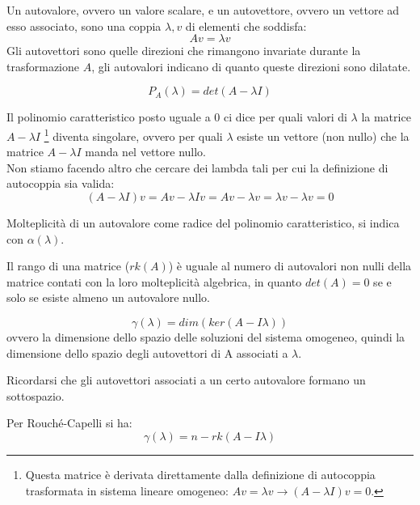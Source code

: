 \documentclass[12pt,a4paper,]{report}
\begin{document}
\begin{definizione}
    Un autovalore, ovvero un valore scalare, e un autovettore, ovvero un vettore ad esso associato, sono una coppia $\lambda, v$ di elementi che soddisfa:
    $$Av = \lambda v$$
    Gli autovettori sono quelle direzioni che rimangono invariate durante la trasformazione $A$, gli autovalori indicano di quanto queste direzioni sono dilatate.
\end{definizione}
\begin{definizione}
    \[P_A(\lambda) = det(A - \lambda I)\]
\end{definizione}
\begin{nota}
    Il polinomio caratteristico posto uguale a 0 ci dice per quali valori di $\lambda$ la matrice $A - \lambda I$
    \footnote{Questa matrice è derivata direttamente dalla definizione di autocoppia trasformata in sistema lineare omogeneo: $Av = \lambda v \to (A- \lambda I)v=0$.}
    diventa singolare, ovvero per quali $\lambda$ esiste un vettore (non nullo) che la matrice $A - \lambda I$ manda nel vettore nullo.\\
    Non stiamo facendo altro che cercare dei lambda tali per cui la definizione di autocoppia sia valida:
    \[
    (A-\lambda I)v = Av - \lambda I v = Av - \lambda v = \lambda v - \lambda v = 0
    \]
\end{nota}
\begin{definizione}
    Molteplicità di un autovalore come radice del polinomio caratteristico, si indica con $\alpha(\lambda)$.
\end{definizione}

\begin{nota}
    Il rango di una matrice ($rk(A)$) è uguale al numero di autovalori non nulli della matrice contati con la loro molteplicità algebrica, in quanto $det(A) = 0$ se e solo se esiste almeno un autovalore nullo.
\end{nota}
\begin{definizione}
    \[
    \gamma (\lambda) = dim(ker(A-I\lambda))
    \]
    ovvero la dimensione dello spazio delle soluzioni del sistema omogeneo, quindi la dimensione dello spazio degli autovettori di A associati a $\lambda$.
    \begin{nota}
        Ricordarsi che gli autovettori associati a un certo autovalore formano un sottospazio.
    \end{nota}
    \noindent
    Per Rouché-Capelli si ha:
    \[
    \gamma(\lambda) = n - rk(A-I\lambda)
    \]
\end{definizione}
\end{document}
